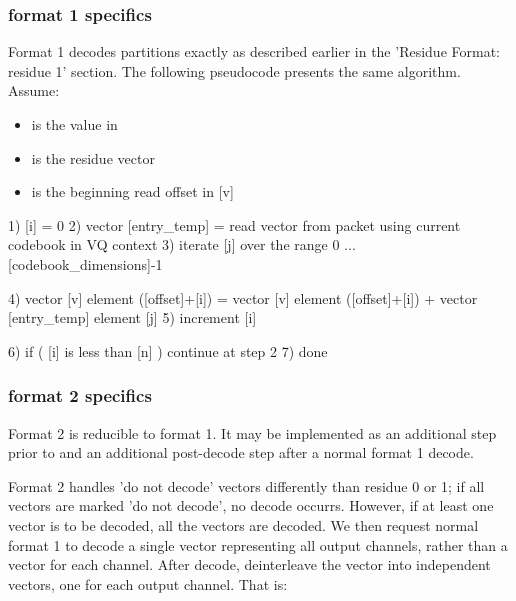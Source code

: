 \subsubsection{format 1 specifics}

Format 1 decodes partitions exactly as described earlier in the
'Residue Format: residue 1' section.  The following pseudocode
presents the same algorithm. Assume:

\begin{itemize}
\item  \varname{[n]} is the value in
\item \varname{[v]} is the residue vector
\item \varname{[offset]} is the beginning read offset in [v]
\end{itemize}


\begin{programlisting}
 1) [i] = 0
 2) vector [entry\_temp] = read vector from packet using current codebook in VQ context
 3) iterate [j] over the range 0 ... [codebook\_dimensions]-1 {

      4) vector [v] element ([offset]+[i]) =
	  vector [v] element ([offset]+[i]) +
          vector [entry\_temp] element [j]
      5) increment [i]

    }

  6) if ( [i] is less than [n] ) continue at step 2
  7) done
\end{programlisting}



\subsubsection{format 2 specifics}

Format 2 is reducible to format 1.  It may be implemented as an additional step prior to and an additional post-decode step after a normal format 1 decode.


Format 2 handles 'do not decode' vectors differently than residue 0 or
1; if all vectors are marked 'do not decode', no decode occurrs.
However, if at least one vector is to be decoded, all the vectors are
decoded.  We then request normal format 1 to decode a single vector
representing all output channels, rather than a vector for each
channel.  After decode, deinterleave the vector into independent vectors, one for each output channel.  That is:

